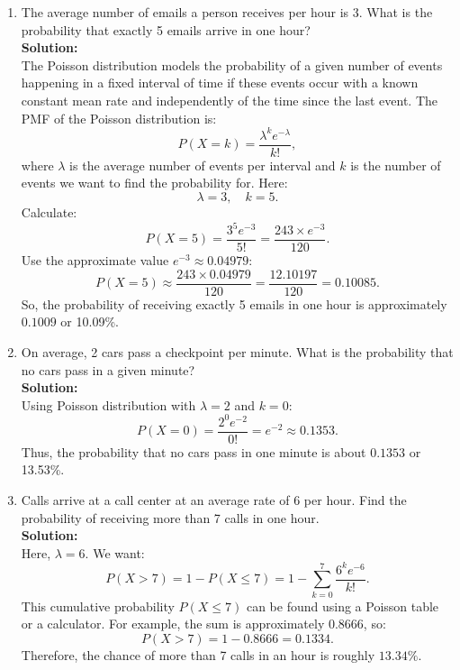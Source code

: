 \documentclass{book}
\begin{document}
\begin{enumerate}

    \item The average number of emails a person receives per hour is 3. What is the probability that exactly 5 emails arrive in one hour? \\
    
    \textbf{Solution:} \\
    
    The Poisson distribution models the probability of a given number of events happening in a fixed interval of time if these events occur with a known constant mean rate and independently of the time since the last event. The PMF of the Poisson distribution is:
    \[
    P(X = k) = \frac{\lambda^k e^{-\lambda}}{k!},
    \]
    where \(\lambda\) is the average number of events per interval and \(k\) is the number of events we want to find the probability for. Here:
    \[
    \lambda = 3, \quad k = 5.
    \]
    Calculate:
    \[
    P(X=5) = \frac{3^5 e^{-3}}{5!} = \frac{243 \times e^{-3}}{120}.
    \]
    Use the approximate value \(e^{-3} \approx 0.04979\):
    \[
    P(X=5) \approx \frac{243 \times 0.04979}{120} = \frac{12.10197}{120} = 0.10085.
    \]
    So, the probability of receiving exactly 5 emails in one hour is approximately \(\boxed{0.1009}\) or 10.09\%.

    \item On average, 2 cars pass a checkpoint per minute. What is the probability that no cars pass in a given minute? \\
    
    \textbf{Solution:} \\
    
    Using Poisson distribution with \(\lambda = 2\) and \(k=0\):
    \[
    P(X=0) = \frac{2^0 e^{-2}}{0!} = e^{-2} \approx 0.1353.
    \]
    Thus, the probability that no cars pass in one minute is about \(\boxed{0.1353}\) or 13.53\%.

    \item Calls arrive at a call center at an average rate of 6 per hour. Find the probability of receiving more than 7 calls in one hour. \\
    
    \textbf{Solution:} \\
    
    Here, \(\lambda = 6\). We want:
    \[
    P(X > 7) = 1 - P(X \leq 7) = 1 - \sum_{k=0}^7 \frac{6^k e^{-6}}{k!}.
    \]
    This cumulative probability \(P(X \leq 7)\) can be found using a Poisson table or a calculator. For example, the sum is approximately 0.8666, so:
    \[
    P(X > 7) = 1 - 0.8666 = 0.1334.
    \]
    Therefore, the chance of more than 7 calls in an hour is roughly \(\boxed{13.34\%}\).
    
\end{enumerate}
\end{document}

